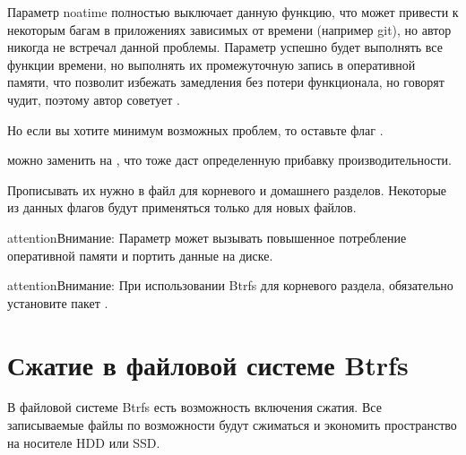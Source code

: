 \documentclass[letterpaper,10pt,russian,openany]{sphinxmanual}
\begin{document}
\sphinxAtStartPar
Параметр noatime полностью выключает данную функцию, что может привести к некоторым багам в приложениях зависимых от времени (например git),
но автор никогда не встречал данной проблемы.
Параметр  успешно будет выполнять все функции времени, но выполнять их промежуточную запись в оперативной памяти,
что позволит избежать замедления без потери функционала, но говорят  чудит, поэтому автор советует .

\sphinxAtStartPar
Но если вы хотите минимум возможных проблем, то оставьте флаг .

\sphinxAtStartPar
{} можно заменить на , что тоже даст определенную прибавку производительности.

\sphinxAtStartPar
Прописывать их нужно в файл  для корневого и домашнего разделов.
Некоторые из данных флагов будут применяться только для новых файлов.

\noindent{}

\begin{sphinxadmonition}{attention}{Внимание:}
\sphinxAtStartPar
Параметр  может вызывать повышенное потребление оперативной памяти и портить данные на диске.
\end{sphinxadmonition}

\begin{sphinxadmonition}{attention}{Внимание:}
\sphinxAtStartPar
При использовании Btrfs для корневого раздела, обязательно установите пакет .
\end{sphinxadmonition}

\ignorespaces 

\section{Сжатие в файловой системе Btrfs}
\label{\detokenize{source/file-systems:btrfs}}\label{\detokenize{source/file-systems:btrfs-comperssion}}\label{\detokenize{source/file-systems:index-2}}
\sphinxAtStartPar
В файловой системе Btrfs есть возможность включения сжатия. Все записываемые файлы по возможности будут сжиматься и экономить пространство на носителе HDD или SSD.
\end{document}

